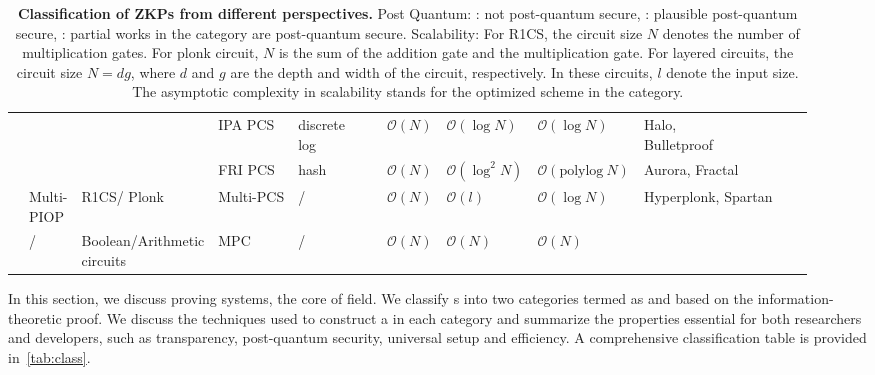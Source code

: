 \documentclass[letterpaper,twocolumn,10pt]{article}
\newcommand{\cmark}{\ding{51}}%
\theoremstyle{definition}
\newcommand{\zk}{\text{zk-SNARK}\xspace}
\newcommand{\PIOP}{\text{PIOP}\xspace}
\begin{document}
\begin{table*}
{\begin{threeparttable}
\begin{tabular}{llllllcllllcl}
				\cline{4-12}
				&  &  &IPA PCS & \makecell[l]{discrete \\log}& \Circle & \cmark & $\mathcal{O}(N)$ & $\mathcal{O}(\log N)$ & $\mathcal{O}(\log N)$ & \makecell[l]{Halo,\\Bulletproof} & \cite{bunz2018bulletproofs,dalek-bulletproofs,chung2022bulletproofs+,eagen2024bulletproofs++} \\
				\cline{4-12}
				& & & FRI PCS& hash & \CIRCLE & \cmark & $\mathcal{O}(N)$ & $\mathcal{O}(\log^{2}N)$  & $\mathcal{O}(\text{polylog} \ N)$ & Aurora, Fractal & \cite{ben2019aurora,chiesa2020fractal,zhang2021doubly}\\
				\cline{2-12}
				& \makecell[l]{Multi-\\PIOP}& R1CS/ Plonk & Multi-PCS & / & \RIGHTcircle & \cmark & $\mathcal{O}(N)$ & $\mathcal{O}(l)$ & $\mathcal{O}(\log N)$& Hyperplonk, Spartan& \cite{chen2023hyperplonk,setty2020spartan,xie2019libra,xie2022orion,golovnev2023brakedown}\\
				\cline{2-12}
				
				& / &  \makecell[l]{Boolean/Arithmetic \\circuits} & MPC & / & \RIGHTcircle & \cmark &  $\mathcal{O}(N)$ & $\mathcal{O}(N)$ & $\mathcal{O}(N)$ & \makecell[l]{Zkboo} & {\cite{giacomelli2016zkboo,chase2017post,katz2018improved}} \\ 
				
				
				\bottomrule
			\end{tabular}%
		\end{threeparttable}
	}
	\caption{\small \textbf{Classification of ZKPs from different perspectives.} Post Quantum: \Circle: not post-quantum secure, \CIRCLE: plausible post-quantum secure, \RIGHTcircle: partial works in the category are post-quantum secure. Scalability: For R1CS, the circuit size $N$ denotes the number of multiplication gates. For plonk circuit, $N$ is the sum of the addition gate and the multiplication gate. For layered circuits, the circuit size $N=dg$, where $d$ and $g$ are the depth and width of the circuit, respectively. In these circuits, $l$ denote the input size.
		The asymptotic complexity in scalability stands for the optimized scheme in the category.}
	\label{tab:class}
\end{table*}


In this section, we discuss proving systems, the core of \zk field. We classify {\zk}s into two categories termed as  and  based on the information-theoretic proof. We discuss the techniques used to construct a \zk in each category and summarize the properties essential for both researchers and developers, such as transparency, post-quantum security, universal setup and efficiency. A comprehensive classification table is provided in~\autoref{tab:class}.
\end{document}
